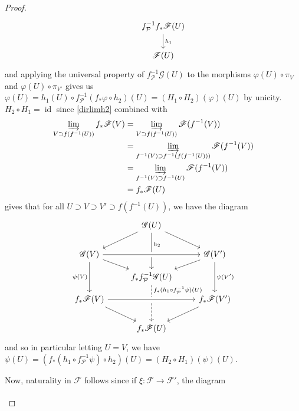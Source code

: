 \documentclass[10pt]{article}
\theoremstyle{definition}
\theoremstyle{remark}
\numberwithin{equation}{section}
\numberwithin{figure}{subsubsection}
\DeclareMathOperator{\id}{id}
\begin{document}
\begin{proof}
\begin{equation*}
\begin{tikzcd}[row sep=small]
      & f_\mathcal{P}^{-1}f_* \mathscr{F}(U) \arrow{dd}{h_1}\\\\
      & \mathscr{F}(U)
    \end{tikzcd}
  \end{equation*}
  and applying the universal property of $f_\mathcal{P}^{-1}\mathscr{G}(U)$ to the morphisms $\varphi(U) \circ \pi_V$ and $\varphi(U) \circ \pi_{V'}$ gives us $\varphi(U) = h_1(U) \circ f_\mathcal{P}^{-1}(f_*\varphi\circ h_2)(U) = (H_1 \circ H_2)(\varphi)(U)$ by unicity. $H_2 \circ H_1 = \id$ since \eqref{dirlimh2} combined with
  \begin{align*}
    \varinjlim_{V \supset f(f^{-1}(U))} f_*\mathscr{F}(V) &= \varinjlim_{V \supset f(f^{-1}(U))} \mathscr{F}(f^{-1}(V))\\
    &= \varinjlim_{f^{-1}(V) \supset f^{-1}(f(f^{-1}(U)))} \mathscr{F}(f^{-1}(V))\\
    &= \varinjlim_{f^{-1}(V) \supset f^{-1}(U)} \mathscr{F}(f^{-1}(V))\\
    &= f_*\mathscr{F}(U)
  \end{align*}
  gives that for all $U \supset V \supset V' \supset f(f^{-1}(U))$, we have the diagram
  \begin{equation*}
    \begin{tikzcd}[row sep=small]
      {} & \mathscr{G}(U)\arrow{ddl}\arrow{ddr}\arrow{ddd}[near start,yshift=-3pt]{h_2}\\
      \\
      \mathscr{G}(V) \arrow{dr}\arrow{dd}[swap]{\psi(V)}\arrow[crossing over]{rr} & & \mathscr{G}(V')\arrow{dl}\arrow{dd}{\psi(V')}\\
      & f_*f_\mathcal{P}^{-1}\mathscr{G}(U)\arrow[dashed]{ddd}[near start,yshift=5pt]{f_*(h_1 \circ f_\mathcal{P}^{-1}\psi)(U)}\\
      f_*\mathscr{F}(V) \arrow[crossing over]{rr}\arrow{ddr} & & f_*\mathscr{F}(V')\arrow{ddl}\\
      \\
      & f_*\mathscr{F}(U)
    \end{tikzcd}
  \end{equation*}
  and so in particular letting $U = V$, we have $\psi(U) = (f_*(h_1 \circ f_\mathcal{P}^{-1}\psi) \circ h_2)(U) = (H_2 \circ H_1)(\psi)(U)$.
  \par Now, naturality in $\mathscr{F}$ follows since if $\xi\colon\mathscr{F} \to \mathscr{F}'$, the diagram
  \begin{equation*}
    \begin{tikzcd}[column sep=16ex]

\end{tikzcd}
\end{equation*}
\end{proof}
\end{document}
